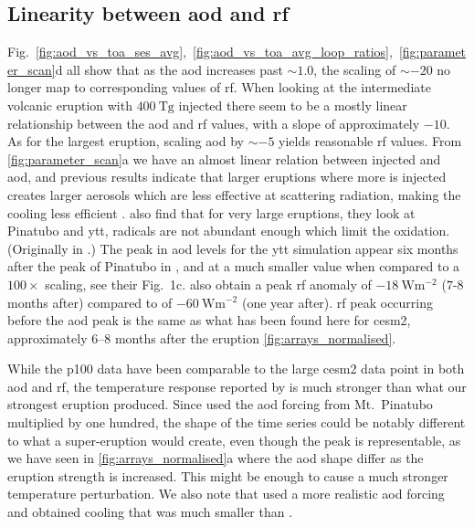 \documentclass[twocol]{ametsocV6.1}
\newcommand{\iso}[1][i]{{#1}njected \ce{SO2}}
\begin{document}
\subsection{Linearity between \gls{aod} and \gls{rf}}

Fig.~\ref{fig:aod_vs_toa_ses_avg},~\ref{fig:aod_vs_toa_avg_loop_ratios},~\ref{fig:parameter_scan}d all show that
as the \gls{aod} increases past \(\sim 1.0\), the scaling of \(\sim -20\) no longer map
to corresponding values of \gls{rf}. When looking at the intermediate volcanic eruption
with \(\SI{400}{\tera\gram}\) \iso{} there seem to be a mostly linear relationship
between the \gls{aod} and \gls{rf} values, with a slope of approximately \(-10\). As for
the largest eruption, scaling \gls{aod} by \(\sim-5\) yields reasonable \gls{rf} values.
From \ref{fig:parameter_scan}a we have an almost linear relation between \iso{} and
\gls{aod}, and previous results indicate that larger eruptions where more  is
injected creates larger aerosols which are less effective at scattering radiation,
making the cooling less efficient \citep{english2013,timmreck2010,timmreck2018}.
\citet{timmreck2010} also find that for very large eruptions, they look at Pinatubo and
\gls{ytt},  radicals are not abundant enough which limit the  oxidation.
(Originally in \citep{bekki1995}.) The peak in \gls{aod} levels for the \gls{ytt}
simulation appear six months after the peak of Pinatubo in \citet{timmreck2010}, and at
a much smaller value when compared to a \(100\times\) scaling, see their Fig.\ 1c.
\citet{timmreck2010} also obtain a peak \gls{rf} anomaly of
\(\SI{-18}{\watt\metre^{-2}}\) (\(7\)-\(8\) months after) compared to \citet{jones2005}
of \(\SI{-60}{\watt\metre^{-2}}\) (one year after). \gls{rf} peak occurring before the
\gls{aod} peak is the same as what has been found here for \gls{cesm2}, approximately
\(6\)--\(8\) months after the eruption \ref{fig:arrays_normalised}.

While the \gls{p100} data have been comparable to the large \gls{cesm2} data point in
both \gls{aod} and \gls{rf}, the temperature response reported by \citet{jones2005} is
much stronger than what our strongest eruption produced. Since \citet{jones2005} used
the \gls{aod} forcing from Mt.\ Pinatubo multiplied by one hundred, the shape of the
time series could be notably different to what a super-eruption would create, even
though the peak is representable, as we have seen in \ref{fig:arrays_normalised}a
where the \gls{aod} shape differ as the eruption strength is increased. This might be
enough to cause a much stronger temperature perturbation. We also note that
\citet{timmreck2010} used a more realistic \gls{aod} forcing and obtained cooling that
was much smaller than \citet{jones2005}.
\end{document}
